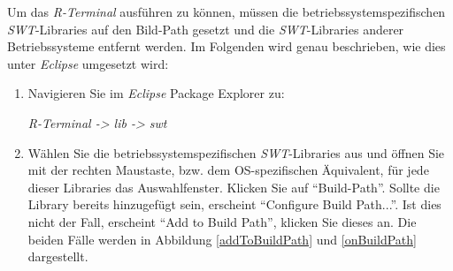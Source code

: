 \documentclass[a4paper, 12pt]{report} %
\begin{document}
Um das \textit{R-Terminal} ausführen zu können, müssen die betriebssystemspezifischen \textit{SWT}-Libraries auf den Bild-Path gesetzt und die \textit{SWT}-Libraries anderer Betriebssysteme entfernt werden.
Im Folgenden wird genau beschrieben, wie dies unter \textit{Eclipse} umgesetzt wird:
\begin{enumerate}
	\item Navigieren Sie im \textit{Eclipse} Package Explorer zu:
	\begin{center}\textit{R-Terminal -> lib  -> swt} \end{center}
	
	\item Wählen Sie die betriebssystemspezifischen \textit{SWT}-Libraries aus und öffnen Sie mit der rechten Maustaste, bzw. dem OS-spezifischen Äquivalent, für jede dieser Libraries das Auswahlfenster. Klicken Sie auf "`Build-Path"'.
		Sollte die Library bereits hinzugefügt sein, erscheint "`Configure Build Path..."'. Ist dies nicht der Fall, erscheint "`Add to Build Path"', klicken Sie dieses an. Die beiden Fälle werden  in Abbildung \ref{addToBuildPath} und \ref{onBuildPath} dargestellt.  \\


\end{enumerate}
\end{document}
